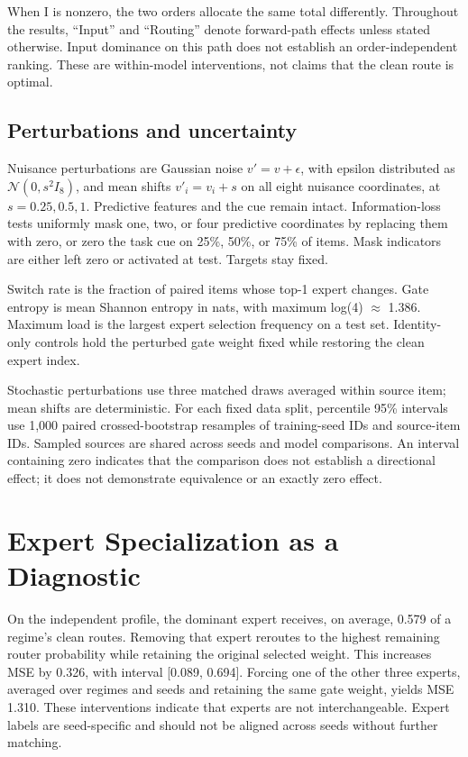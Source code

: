 \documentclass[10pt,letterpaper]{article}
\begin{document}
When I is nonzero, the two orders allocate the same total differently. Throughout the results, ``Input'' and ``Routing'' denote forward-path effects unless stated otherwise. Input dominance on this path does not establish an order-independent ranking. These are within-model interventions, not claims that the clean route is optimal.


\subsection{Perturbations and uncertainty}

Nuisance perturbations are Gaussian noise $v'=v+\epsilon$, with epsilon distributed as $\mathcal N(0,s^2I_8)$, and mean shifts $v'_i=v_i+s$ on all eight nuisance coordinates, at $s=0.25,0.5,1$. Predictive features and the cue remain intact. Information-loss tests uniformly mask one, two, or four predictive coordinates by replacing them with zero, or zero the task cue on 25\%, 50\%, or 75\% of items. Mask indicators are either left zero or activated at test. Targets stay fixed.


Switch rate is the fraction of paired items whose top-1 expert changes. Gate entropy is mean Shannon entropy in nats, with maximum log(4) \ensuremath{\approx} 1.386. Maximum load is the largest expert selection frequency on a test set. Identity-only controls hold the perturbed gate weight fixed while restoring the clean expert index.


Stochastic perturbations use three matched draws averaged within source item; mean shifts are deterministic. For each fixed data split, percentile 95\% intervals use 1,000 paired crossed-bootstrap resamples of training-seed IDs and source-item IDs. Sampled sources are shared across seeds and model comparisons. An interval containing zero indicates that the comparison does not establish a directional effect; it does not demonstrate equivalence or an exactly zero effect.


\FloatBarrier

\section{Expert Specialization as a Diagnostic}

On the independent profile, the dominant expert receives, on average, 0.579 of a regime's clean routes. Removing that expert reroutes to the highest remaining router probability while retaining the original selected weight. This increases MSE by 0.326, with interval [0.089, 0.694]. Forcing one of the other three experts, averaged over regimes and seeds and retaining the same gate weight, yields MSE 1.310. These interventions indicate that experts are not interchangeable. Expert labels are seed-specific and should not be aligned across seeds without further matching.
\end{document}
